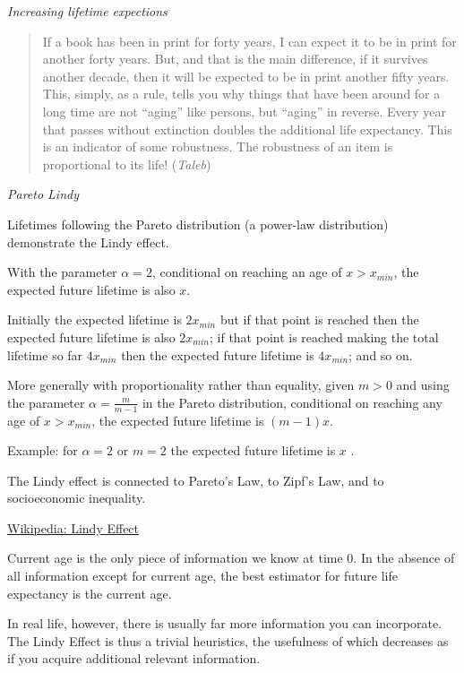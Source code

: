 \documentclass[
]{book}
\begin{document}
\emph{Increasing lifetime expections}

\begin{quote}
If a book has been in print for forty years, I can expect it to be in print for another forty years. But, and that is the main difference, if it survives another decade, then it will be expected to be in print another fifty years. This, simply, as a rule, tells you why things that have been around for a long time are not ``aging'' like persons, but ``aging'' in reverse. Every year that passes without extinction doubles the additional life expectancy. This is an indicator of some robustness. The robustness of an item is proportional to its life! (\emph{Taleb})
\end{quote}

\emph{Pareto Lindy}

Lifetimes following the Pareto distribution (a power-law distribution) demonstrate the Lindy effect.

With the parameter \(α = 2\), conditional on reaching an age of \(x > x_{min}\),
the expected future lifetime is also \(x\).

Initially the expected lifetime is \(2 x_{min}\) but if that point is reached
then the expected future lifetime is also \(2 x_{min}\);
if that point is reached making the total lifetime so far \(4 x_{min}\)
then the expected future lifetime is \(4 x_{min}\); and so on.

More generally with proportionality rather than equality,
given \(m > 0\) and using the parameter \(\alpha = \frac {m}{m-1}\)
in the Pareto distribution, conditional on reaching any age of \(x > x_{min}\),
the expected future lifetime is \(( m − 1 ) x\).

Example: for \(α = 2\) or \(m = 2\) the expected future lifetime is \(x\) .

The Lindy effect is connected to Pareto's Law, to Zipf's Law, and to socioeconomic inequality.

\href{https://en.wikipedia.org/wiki/Lindy_effect}{Wikipedia: Lindy Effect}

Current age is the only piece of information we know at time 0.
In the absence of all information except for current age,
the best estimator for future life expectancy is the current age.

In real life, however, there is usually far more information you can incorporate.
The Lindy Effect is thus a trivial heuristics,
the usefulness of which decreases as if you acquire additional relevant information.
\end{document}
